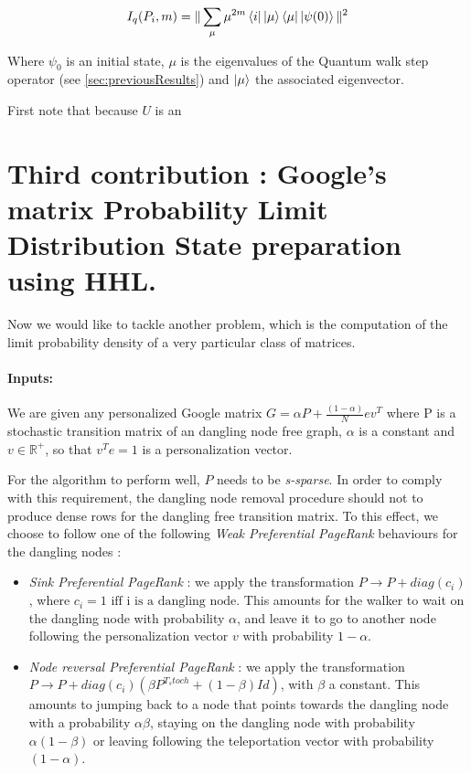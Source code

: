 \documentclass{article}
\begin{document}
\begin{equation}
    I_q(P_i, m) = \| \sum_\mu \mu^{2m} \bra{i}\ket{\mu} \bra{\mu} \ket{\psi (0)} \|^2
\end{equation}

Where $\psi_{0}$ is an initial state, $\mu$ is the eigenvalues of the Quantum walk step operator (see \ref{sec:previousResults}) and $\ket{\mu}$ the associated eigenvector.

First note that because $U$ is an 


\section{Third contribution : Google's matrix Probability Limit Distribution State preparation using HHL.}

Now we would like to tackle another problem, which is the computation of the limit probability density of a very particular class of matrices.

\paragraph{Inputs:}
We are given any personalized Google matrix $G = \alpha P + \frac{(1-\alpha)}{N} e v^T$ where P is a stochastic transition matrix of an dangling node free graph, $\alpha$ is a constant and $v \in \mathbb{R}^{+}$, so that $v^T e = 1$ is a personalization vector.

For the algorithm to perform well, $P$ needs to be \textit{s-sparse}. In order to comply with this requirement, the dangling node removal procedure should not to produce dense rows for the dangling free transition matrix. To this effect, we choose to follow one of the following \textit{Weak Preferential PageRank} behaviours for the dangling nodes :
\begin{itemize}
    \item \textit{Sink Preferential PageRank} : we apply the transformation $P \rightarrow P + diag(c_i)$, where $c_i = 1 \mbox{ iff i is a dangling node}$. This amounts for the walker to wait on the dangling node with probability $\alpha$, and leave it to go to another node following the personalization vector $v$ with probability $1 - \alpha$.
    \item \textit{Node reversal Preferential PageRank} : we apply the transformation $P \rightarrow P + diag(c_i) (\beta P^{T_stoch} + (1-\beta)Id)$, with $\beta$ a constant. This amounts to jumping back to a node that points towards the dangling node with a probability $\alpha\beta$, staying on the dangling node with probability $\alpha(1-\beta)$ or leaving following the teleportation vector with probability $(1-\alpha)$.
\end{itemize}
\end{document}
